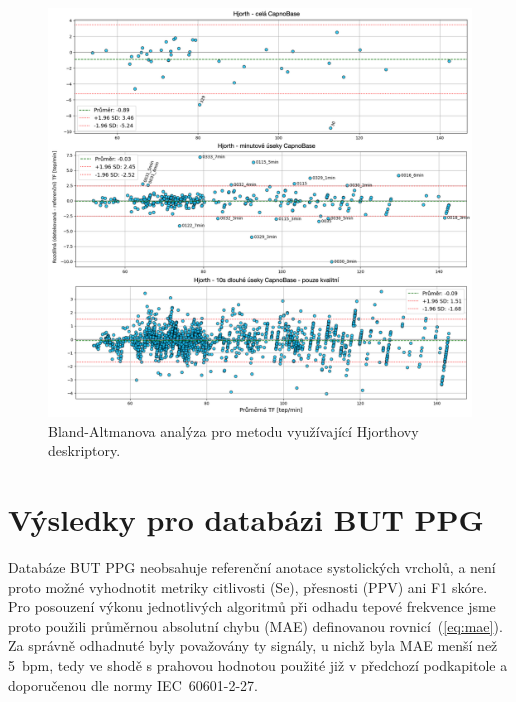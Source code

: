 \begin{figure}[!ht]
	\centering
	\includegraphics[width=1\textwidth]{./obrazky/vysledky/BlandAltman_CB_Hjorth.png}
	\caption[Bland-Altmanova analýza pro metodu využívající Hjorthovy deskriptory - CapnoBase]{Bland-Altmanova analýza pro metodu využívající Hjorthovy deskriptory.}
	\label{fig:capnobase_BlandAltman_hjorth}
\end{figure}

\FloatBarrier
\section{Výsledky pro databázi BUT PPG}
\label{sec:vysledky_butppg}
Databáze \acs{BUT PPG} neobsahuje referenční anotace systolických vrcholů, a není proto možné vyhodnotit metriky citlivosti (\acs{Se}), přesnosti (\acs{PPV}) ani F1 skóre.
Pro posouzení výkonu jednotlivých algoritmů při odhadu tepové frekvence jsme proto použili průměrnou absolutní chybu (\acs{MAE}) definovanou rovnicí~(\ref{eq:mae}).
Za správně odhadnuté byly považovány ty signály, u nichž byla \acs{MAE} menší než 5~\acs{bpm}, tedy ve shodě s prahovou hodnotou použité již v předchozí podkapitole a doporučenou dle normy IEC~60601-2-27.

